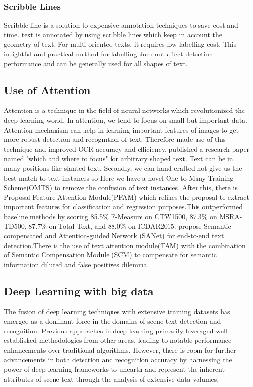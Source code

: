 \subsubsection{Scribble Lines}
Scribble line \cite{scibble} is a solution to expensive annotation techniques to save cost and time. text is annotated by using scribble lines which keep in account the geometry of text. For multi-oriented texts, it requires low labelling cost. This insightful and practical method for labelling does not affect detection performance and can be generally used for all shapes of text.

\subsection{Use of Attention}
Attention is a technique in the field of neural networks which revolutionized the deep learning world. In attention, we tend to focus on small but important data. Attention mechanism can help in learning important features of images to get more robust detection and recognition of text. Therefore made use of this technique and improved OCR accuracy and efficiency.
\cite{where2021focus} published a research paper named "which and where to focus" for arbitrary shaped text. Text can be in many positions like slanted text. Secondly, we can hand-crafted not give us the best match to text instances so Here we have a novel One-to-Many Training Scheme(OMTS) to remove the confusion of text instances. After this, there is Proposal Feature Attention Module(PFAM) which refines the proposal to extract important features for classification and regression purposes.This outperformed baseline methods by scoring 85.5\% F-Measure on CTW1500, 87.3\% on MSRA-TD500,  87.7\% on Total-Text, and 88.0\% on ICDAR2015.\cite{SanNet} propose Semantic-compensated and Attention-guided Network (SANet) for end-to-end text detection.There is the use of text attention module(TAM) with the combination of Semantic Compensation Module (SCM) to compensate for semantic information diluted and false positives dilemma.

\subsection{Deep Learning with big data}
The fusion of deep learning techniques with extensive training datasets has emerged as a dominant force in the domains of scene text detection and recognition. Previous approaches in deep learning primarily leveraged well-established methodologies from  other areas, leading to notable performance enhancements over traditional algorithms. However, there is room for further advancements in both detection and recognition accuracy by harnessing the power of deep learning frameworks to unearth and represent the inherent attributes of scene text through the analysis of extensive data volumes.

